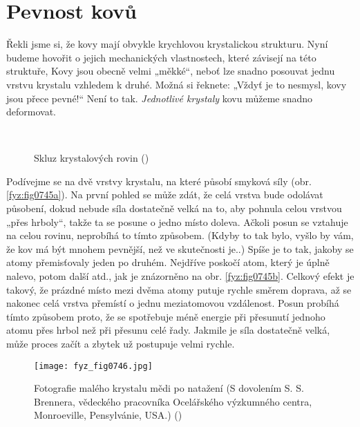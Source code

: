   \section{Pevnost kovů}\label{fyz:IIchapXXXsecVII}
    Řekli jsme si, že kovy mají obvykle krychlovou krystalickou strukturu. Nyní budeme hovořit o 
    jejich mechanických vlastnostech, které závisejí na této struktuře, Kovy jsou obecně velmi 
    „měkké“, neboť lze snadno posouvat jednu vrstvu krystalu vzhledem k druhé. Možná si řeknete: 
    „Vždyť je to nesmysl, kovy jsou přece pevné!“ Není to tak. \emph{Jednotlivé krystaly} kovu 
    můžeme snadno deformovat.
    
    \begin{figure}[ht!]    %
      \centering
                     \\
      \caption{Skluz krystalových rovin (\cite[s.~552]{Feynman02})}
      \label{fyz:fig0745}
    \end{figure}
    
    Podívejme se na dvě vrstvy krystalu, na které působí smyková síly (obr. \ref{fyz:fig0745a}). Na 
    první pohled se může zdát, že celá vrstva bude odolávat působení, dokud nebude síla dostatečně 
    velká na to, aby pohnula celou vrstvou „přes hrboly“, takže ta se posune o jedno místo doleva. 
    Ačkoli posun se vztahuje na celou rovinu, neprobíhá to tímto způsobem. (Kdyby to tak bylo, 
    vyšlo by vám, že kov má být mnohem pevnější, než ve skutečnosti je..) Spíše je to tak, jakoby 
    se atomy přemisťovaly jeden po druhém. Nejdříve poskočí atom, který je úplně nalevo, potom 
    další atd., jak je znázorněno na obr. \ref{fyz:fig0745b}. Celkový efekt je takový, že prázdné 
    místo mezi dvěma atomy putuje rychle směrem doprava, až se nakonec celá vrstva přemístí o jednu 
    meziatomovou vzdálenost. Posun probíhá tímto způsobem proto, že se spotřebuje méně energie při 
    přesunutí jednoho atomu přes hrbol než při přesunu celé řady. Jakmile je síla dostatečně velká, 
    může proces začít a zbytek už postupuje velmi rychle.
    
    
    \begin{figure}[ht!] %
      \centering
      \texttt{[image: fyz\_fig0746.jpg]}
      \caption{Fotografie malého krystalu mědi po natažení (S dovolením S. S. Brennera, vědeckého 
               pracovníka Ocelářského výzkumného centra, Monroeville, Pensylvánie, USA.)
               (\cite[s.~552]{Feynman02})}
      \label{fyz:fig0746}
    \end{figure}
    
